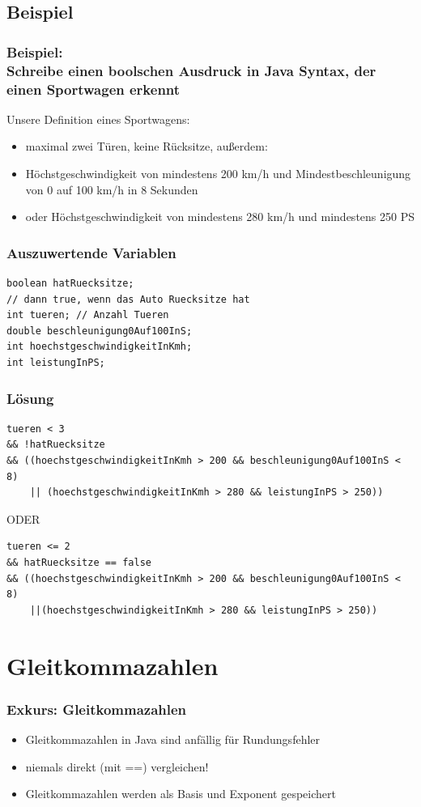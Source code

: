 \documentclass[final]{beamer}
\begin{document}
\subsection{Beispiel}
\begin{frame}
	\frametitle{Beispiel: \\Schreibe einen boolschen Ausdruck in Java Syntax, der einen Sportwagen erkennt}
	Unsere Definition eines Sportwagens:	\\
	\begin{itemize}
		\item{maximal zwei Türen, keine Rücksitze, außerdem:}
		\item{Höchstgeschwindigkeit von mindestens 200 km/h und  Mindestbeschleunigung von 0 auf 100 km/h in 8 Sekunden}
		\item{oder Höchstgeschwindigkeit von mindestens 280 km/h und mindestens 250 PS}
	\end{itemize}
\end{frame}

\begin{frame}[containsverbatim]
	\frametitle{Auszuwertende Variablen}
	\begin{lstlisting}
boolean hatRuecksitze;
// dann true, wenn das Auto Ruecksitze hat
int tueren; // Anzahl Tueren
double beschleunigung0Auf100InS;
int hoechstgeschwindigkeitInKmh;
int leistungInPS;
	\end{lstlisting}
\end{frame}

\begin{frame}[containsverbatim]
	\frametitle{Lösung}
\begin{lstlisting}
tueren < 3
&& !hatRuecksitze
&& ((hoechstgeschwindigkeitInKmh > 200 && beschleunigung0Auf100InS < 8)
	|| (hoechstgeschwindigkeitInKmh > 280 && leistungInPS > 250))
\end{lstlisting}
\vfill
ODER
\vfill
\begin{lstlisting}
tueren <= 2
&& hatRuecksitze == false
&& ((hoechstgeschwindigkeitInKmh > 200 && beschleunigung0Auf100InS < 8)
	||(hoechstgeschwindigkeitInKmh > 280 && leistungInPS > 250))
\end{lstlisting}

\end{frame}

\section{Gleitkommazahlen}
\begin{frame}
	\frametitle{Exkurs: Gleitkommazahlen}
	\begin{itemize}
		\item{Gleitkommazahlen in Java sind anfällig für Rundungsfehler}
		\item{niemals direkt (mit ==) vergleichen!}
		\item{Gleitkommazahlen werden als Basis und Exponent gespeichert}
	\end{itemize}
\end{frame}
\end{document}
